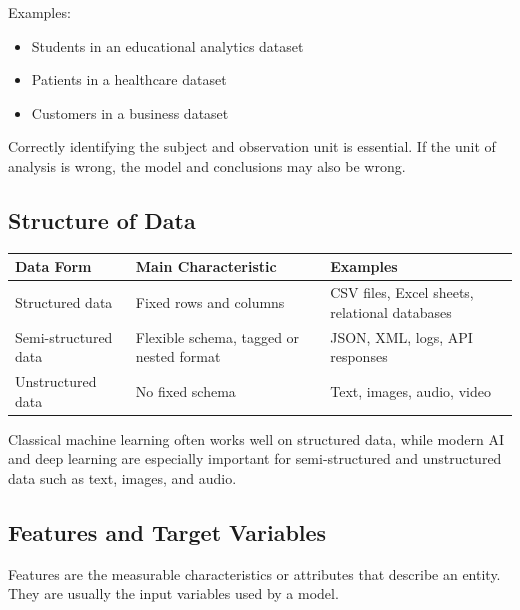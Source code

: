 \documentclass[11pt,a4paper]{article}
\begin{document}
Examples:
\begin{itemize}[leftmargin=*]
  \item Students in an educational analytics dataset
  \item Patients in a healthcare dataset
  \item Customers in a business dataset
\end{itemize}

\begin{alertbox}
Correctly identifying the subject and observation unit is essential. If the unit of analysis is wrong, the model and conclusions may also be wrong.
\end{alertbox}

\subsection{Structure of Data}

\begin{longtable}{@{}p{3.0cm}p{3.8cm}p{6.7cm}@{}}
\toprule
\rowcolor{primary!15}
\textbf{Data Form} & \textbf{Main Characteristic} & \textbf{Examples} \\
\midrule
\endhead
Structured data & Fixed rows and columns & CSV files, Excel sheets, relational databases \\
\addlinespace
Semi-structured data & Flexible schema, tagged or nested format & JSON, XML, logs, API responses \\
\addlinespace
Unstructured data & No fixed schema & Text, images, audio, video \\
\bottomrule
\end{longtable}

\begin{conceptbox}
Classical machine learning often works well on structured data, while modern AI and deep learning are especially important for semi-structured and unstructured data such as text, images, and audio.
\end{conceptbox}

\subsection{Features and Target Variables}

\begin{definitionbox}[Features]
Features are the measurable characteristics or attributes that describe an entity. They are usually the input variables used by a model.
\end{definitionbox}
\end{document}
